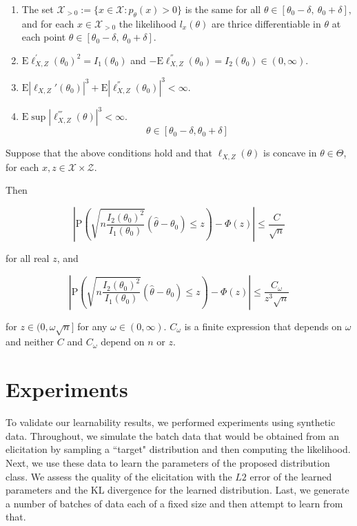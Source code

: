 \begin{enumerate}
	\item The set $\mathcal{X}_{>0} :=\{x\in \mathcal{X}:p_{\theta}(x)>0\}$ is the same for all $\theta\in [\theta_{0}-\delta,\ \theta_{0}+\delta],$ and for each $x\in \mathcal{X}_{>0}$ the likelihood $l_{x}(\theta)$ are thrice differentiable in $\theta$ at each point $\theta\in [\theta_{0}-\delta,\ \theta_{0}+\delta].$
	\item $\mathrm{E}\ell_{X,Z}^{'}(\theta_{0})^{2}=I_1(\theta_0)$ and $-\mathrm{E}\ell_{X,Z}^{''}(\theta_{0})=I_2(\theta_{0})\in (0,\infty)$.
	\item $\mathrm{E}|\ell_{X,Z}'(\theta_{0})|^{3}+\mathrm{E}|\ell_{X,Z}^{''}(\theta_{0})|^{3}<\infty.$
	\item $\mathrm{E} \sup |\ell_{X,Z}^{'''}(\theta)|^{3}<\infty.$
	$$
	\theta\in [\theta_0-\delta,\theta_0+\delta]
	$$
\end{enumerate}

Suppose that the above conditions hold and that $\ell_{X,Z}(\theta)$ is concave in $\theta\in \Theta$, for each $x,z\in \mathcal{X}\times \mathcal{Z}$. 

Then

$$|\mathrm{P}\left(\sqrt{n \frac{I_2(\theta_{0})^2}{I_1(\theta_0)}}(\hat{\theta}-\theta_{0})\leq z\right)-\Phi(z)|\leq\frac{C}{\sqrt{n}}$$

for all real $z$, and

$$|\mathrm{P}(\sqrt{n\frac{I_2(\theta_{0})^2}{I_1(\theta_0)}}(\hat{\theta}-\theta_{0})\leq z)-\Phi(z)|\leq\frac{C_{\omega}}{z^3 \sqrt{n}}$$

for $z\in (0,\omega \sqrt{n}]$ for any $\omega\in (0,\infty)$. $C_{\omega}$ is a finite expression that depends on $\omega$ and neither $C$ and $C_{\omega}$ depend on $n$ or $z$.

\section{Experiments}

To validate our learnability results, we performed experiments using synthetic data. Throughout, we simulate the batch data that would be obtained from an elicitation by sampling a ``target" distribution and then computing the likelihood. Next, we use these data to learn the parameters of the proposed distribution class. We assess the quality of the elicitation with the $L2$ error of the learned parameters and the KL divergence for the learned distribution. Last, we generate a number of batches of data each of a fixed size and then attempt to learn from that.  

